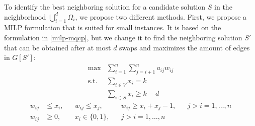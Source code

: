 \documentclass[draft,final]{vutinfth} %
\begin{document}
To identify the best neighboring solution for a candidate solution $S$ in the neighborhood $\bigcup_{i=1}^d \Omega_i$, we propose two different methods. First, we propose a MILP formulation that is suited for small instances. 
It is based on the formulation in \ref{milp-mqcp}, but we change it to find the neighboring solution $S'$ that can be obtained after at most $d$ swaps and maximizes the amount of edges in $G[S']$: 
\begin{align}
    \max & \sum_{i=1}^n \sum_{j=i+1}^n a_{ij} w_{ij} \\
    \text{s.t. } & \sum_{i \in V} x_i = k \\
     & \sum_{i \in S} x_i \geq k - d    
\end{align}
\begin{align}
    w_{ij} &\leq x_i, & & w_{ij} \leq x_j, & & w_{ij} \geq x_i + x_j - 1, & & j > i=1, \dots , n \\
    w_{ij} &\geq 0,   & & x_i \in \{0,1\}, & & j > i = 1, \dots, n        & & 
\end{align}
\end{document}
